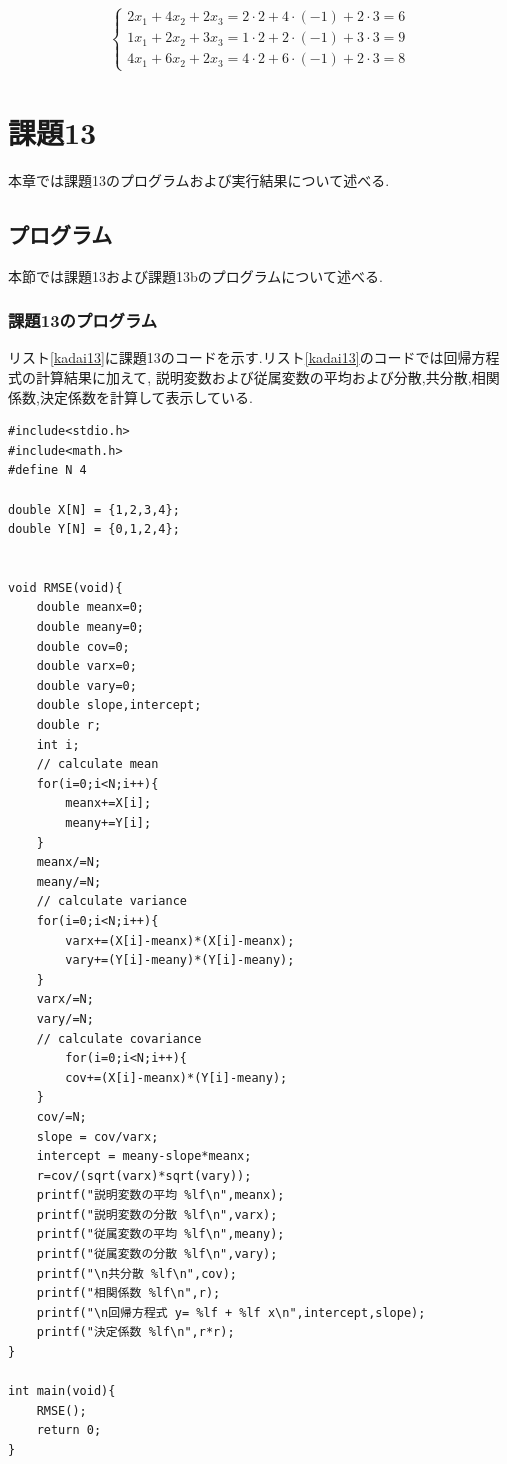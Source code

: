 \documentclass[a4j]{jarticle}
\begin{document}
      \begin{eqnarray}
        \begin{cases}
          2x_1 + 4x_2 + 2x_3 = 2\cdot 2 + 4\cdot (-1) + 2\cdot 3 =6 \\
          1x_1 + 2x_2 + 3x_3 = 1\cdot 2 + 2\cdot (-1) + 3\cdot 3 =9 \\
          4x_1 + 6x_2 + 2x_3 = 4\cdot 2 + 6\cdot (-1) + 2\cdot 3 =8
        \end{cases}
        \label{kadai12hand}
      \end{eqnarray}

      \section{課題13}
      本章では課題13のプログラムおよび実行結果について述べる.
      \subsection{プログラム}
      本節では課題13および課題13bのプログラムについて述べる.
      \subsubsection{課題13のプログラム}
      リスト\ref{kadai13}に課題13のコードを示す.リスト\ref{kadai13}のコードでは回帰方程式の計算結果に加えて,
      説明変数および従属変数の平均および分散,共分散,相関係数,決定係数を計算して表示している.
      \begin{lstlisting}[basicstyle=\ttfamily\footnotesize, frame=single,label=kadai13,caption=課題13のコード]
#include<stdio.h>
#include<math.h>
#define N 4

double X[N] = {1,2,3,4};
double Y[N] = {0,1,2,4};


void RMSE(void){
    double meanx=0;
    double meany=0;
    double cov=0;
    double varx=0;
    double vary=0;
    double slope,intercept;
    double r;
    int i;
    // calculate mean
    for(i=0;i<N;i++){
        meanx+=X[i];
        meany+=Y[i];
    }
    meanx/=N;
    meany/=N;
    // calculate variance
    for(i=0;i<N;i++){
        varx+=(X[i]-meanx)*(X[i]-meanx);
        vary+=(Y[i]-meany)*(Y[i]-meany);
    }    
    varx/=N;
    vary/=N;
    // calculate covariance
        for(i=0;i<N;i++){
        cov+=(X[i]-meanx)*(Y[i]-meany);
    } 
    cov/=N;
    slope = cov/varx;
    intercept = meany-slope*meanx;
    r=cov/(sqrt(varx)*sqrt(vary));
    printf("説明変数の平均 %lf\n",meanx);
    printf("説明変数の分散 %lf\n",varx);
    printf("従属変数の平均 %lf\n",meany);
    printf("従属変数の分散 %lf\n",vary);
    printf("\n共分散 %lf\n",cov);
    printf("相関係数 %lf\n",r);
    printf("\n回帰方程式 y= %lf + %lf x\n",intercept,slope);
    printf("決定係数 %lf\n",r*r);
}

int main(void){
    RMSE();
    return 0;
}
      \end{lstlisting}
\end{document}
